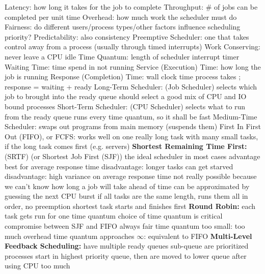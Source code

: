 \documentclass[12pt]{article}
\begin{document}
\begin{spacing}{0.6}
\begin{multicols*}{2}
\begin{flushleft}
\begin{outline}[longenum]
  \1 Latency: how long it takes for the job to complete
  \1 Throughput: \# of jobs can be completed per unit time
  \1 Overhead: how much work the scheduler must do
  \1 Fairness: do different users/process types/other factors influence scheduling priority?
  \1 Predictability: also consistency
  \1 Preemptive Scheduler: one that takes control away from a process (usually through timed interrupts)
  \1 Work Conserving: never leave a CPU idle
  \1 Time Quantum: length of scheduler interrupt timer
  \1 Waiting Time: time spend in not running
  \1 Service (Execution) Time: how long the job is running
  \1 Response (Completion) Time: wall clock time process takes
    ; response = waiting + ready
  \1 Long-Term Scheduler: (Job Scheduler)
    \2 selects which job to brought into the ready queue
    \2 should select a good mix of CPU and IO bound processes
  \2 Short-Term Scheduler: (CPU Scheduler)
    \2 selects what to run from the ready queue
    \2 runs every time quantum, so it shall be fast
  \1 Medium-Time Scheduler: swaps out programs from main memory (suspends them)
  \1 First In First Out (FIFO), or FCFS:
    \2 works well on one really long task with many small tasks, if the long task comes first (e.g. servers)
  \1 \textbf{Shortest Remaining Time First:} (SRTF) (or Shortest Job First (SJF))
    \2 the ideal scheduler in most cases
      \3 advantage best for average response time
      \3 disadvantage: longer tasks can get starved
      \3 disadvantage: high variance on average response time
    \2 not really possible because we can't know how long a job will take ahead of time
      \3 can be approximated by guessing the next CPU burst
    \2 if all tasks are the same length, runs them all in order, no preemption
    \2 shortest task starts and finishes first
  \1 \textbf{Round Robin:}
    \2 each task gets run for one time quantum
      \3 choice of time quantum is critical
    \2 compromise between SJF and FIFO
    \2 always fair
    \2 time quantum too small: too much overhead
    \2 time quantum approaches $\infty$: equivalent to FIFO
  \1 \textbf{Multi-Level Feedback Scheduling:}
    \2 have multiple ready queues
      \3 sub-queue are prioritized
    \2 processes start in highest priority queue, then are moved to lower queue after using CPU too much

\end{outline}
\end{flushleft}
\end{multicols*}
\end{spacing}
\end{document}
